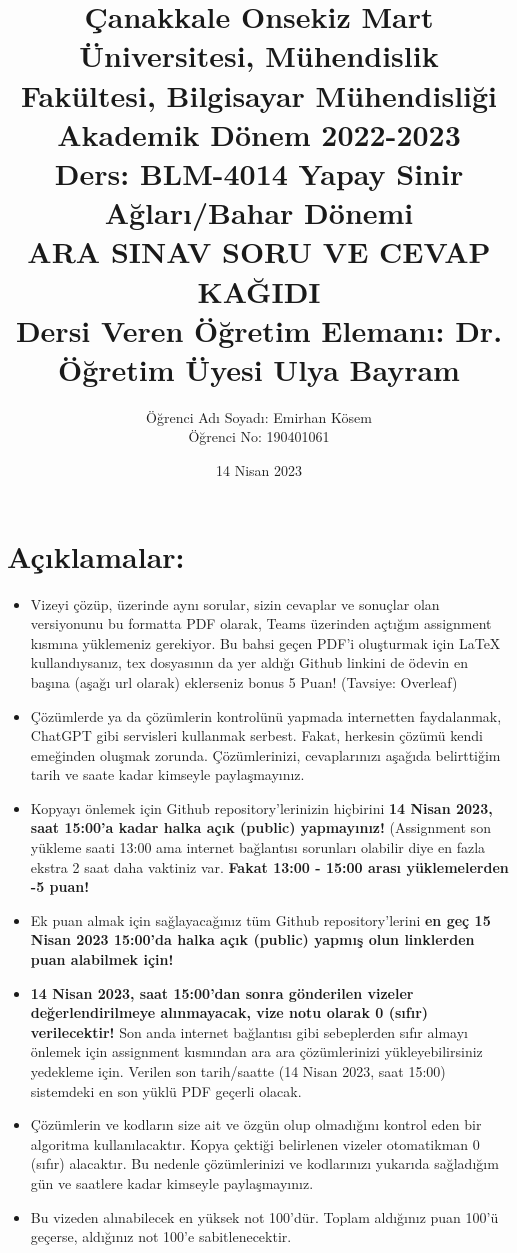 \documentclass[11pt]{article}
\title{Çanakkale Onsekiz Mart Üniversitesi, Mühendislik Fakültesi, Bilgisayar Mühendisliği Akademik Dönem 2022-2023\\
Ders: BLM-4014 Yapay Sinir Ağları/Bahar Dönemi\\ 
ARA SINAV SORU VE CEVAP KAĞIDI\\
Dersi Veren Öğretim Elemanı: Dr. Öğretim Üyesi Ulya Bayram}
\author{%
\begin{minipage}{\textwidth}
\raggedright
Öğrenci Adı Soyadı: Emirhan Kösem\\ %
Öğrenci No: 190401061
\end{minipage}%
}
\date{14 Nisan 2023}
\begin{document}
\maketitle

\vspace{-.5in}
\section*{Açıklamalar:}
\begin{itemize}
    \item Vizeyi çözüp, üzerinde aynı sorular, sizin cevaplar ve sonuçlar olan versiyonunu bu formatta PDF olarak, Teams üzerinden açtığım assignment kısmına yüklemeniz gerekiyor. Bu bahsi geçen PDF'i oluşturmak için LaTeX kullandıysanız, tex dosyasının da yer aldığı Github linkini de ödevin en başına (aşağı url olarak) eklerseniz bonus 5 Puan! (Tavsiye: Overleaf)
    \item Çözümlerde ya da çözümlerin kontrolünü yapmada internetten faydalanmak, ChatGPT gibi servisleri kullanmak serbest. Fakat, herkesin çözümü kendi emeğinden oluşmak zorunda. Çözümlerinizi, cevaplarınızı aşağıda belirttiğim tarih ve saate kadar kimseyle paylaşmayınız. 
    \item Kopyayı önlemek için Github repository'lerinizin hiçbirini \textbf{14 Nisan 2023, saat 15:00'a kadar halka açık (public) yapmayınız!} (Assignment son yükleme saati 13:00 ama internet bağlantısı sorunları olabilir diye en fazla ekstra 2 saat daha vaktiniz var. \textbf{Fakat 13:00 - 15:00 arası yüklemelerden -5 puan!}
    \item Ek puan almak için sağlayacağınız tüm Github repository'lerini \textbf{en geç 15 Nisan 2023 15:00'da halka açık (public) yapmış olun linklerden puan alabilmek için!}
    \item \textbf{14 Nisan 2023, saat 15:00'dan sonra gönderilen vizeler değerlendirilmeye alınmayacak, vize notu olarak 0 (sıfır) verilecektir!} Son anda internet bağlantısı gibi sebeplerden sıfır almayı önlemek için assignment kısmından ara ara çözümlerinizi yükleyebilirsiniz yedekleme için. Verilen son tarih/saatte (14 Nisan 2023, saat 15:00) sistemdeki en son yüklü PDF geçerli olacak.
    \item Çözümlerin ve kodların size ait ve özgün olup olmadığını kontrol eden bir algoritma kullanılacaktır. Kopya çektiği belirlenen vizeler otomatikman 0 (sıfır) alacaktır. Bu nedenle çözümlerinizi ve kodlarınızı yukarıda sağladığım gün ve saatlere kadar kimseyle paylaşmayınız.
    \item Bu vizeden alınabilecek en yüksek not 100'dür. Toplam aldığınız puan 100'ü geçerse, aldığınız not 100'e sabitlenecektir.

\end{itemize}
\end{document}
